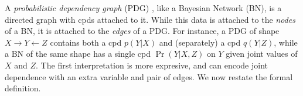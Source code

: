 \documentclass[twoside]{article}
\theoremstyle{plain}
\theoremstyle{definition}
\newcommand{\ed}[3]{#2%
	  \overset{\smash{\mskip-5mu\raisebox{-1pt}{$\scriptscriptstyle
	        #1$}}}{\rightarrow} #3}
\begin{document}
A \emph{probabilistic dependency graph} (PDG)
\parencite{richardson2020probabilistic}, like a Bayesian Network (BN), is a
directed graph with cpds attached to it. While this data is attached
to the \emph{nodes} of a BN, it is attached to the \emph{edges} of a PDG.
For instance, a PDG of shape 
$
X \to Y \leftarrow Z
$
contains both a cpd $p(Y | X)$ and (separately) a cpd $q(Y | Z)$, while a BN of the same shape has a single cpd $\Pr(Y | X,Z)$ on $Y$ given joint values of $X$ and $Z$.
The first interpretation is more expresive, and can encode joint dependence with an extra variable and pair of edges.
We now restate the formal definition.
\end{document}
